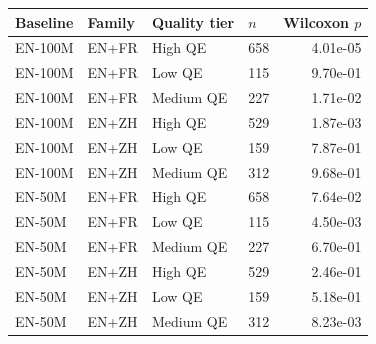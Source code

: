 \begin{tabular}{@{}llllr@{}}
\toprule
Baseline & Family & Quality tier & $n$ & Wilcoxon $p$ \\
\midrule
EN-100M & EN+FR & High QE & 658 & 4.01e-05 \\
EN-100M & EN+FR & Low QE & 115 & 9.70e-01 \\
EN-100M & EN+FR & Medium QE & 227 & 1.71e-02 \\
EN-100M & EN+ZH & High QE & 529 & 1.87e-03 \\
EN-100M & EN+ZH & Low QE & 159 & 7.87e-01 \\
EN-100M & EN+ZH & Medium QE & 312 & 9.68e-01 \\
EN-50M & EN+FR & High QE & 658 & 7.64e-02 \\
EN-50M & EN+FR & Low QE & 115 & 4.50e-03 \\
EN-50M & EN+FR & Medium QE & 227 & 6.70e-01 \\
EN-50M & EN+ZH & High QE & 529 & 2.46e-01 \\
EN-50M & EN+ZH & Low QE & 159 & 5.18e-01 \\
EN-50M & EN+ZH & Medium QE & 312 & 8.23e-03 \\
\bottomrule
\end{tabular}
